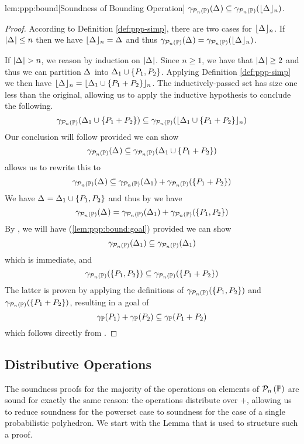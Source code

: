 \begin{replemma}{lem:ppp:bound}[Soundness of Bounding Operation]
$\gamma_{\mathcal{P}_{n}\left( \mathbb{P} \right)}(\Delta_{}) \subseteq \gamma_{\mathcal{P}_{n}\left( \mathbb{P} \right)}(
    \lfloor \Delta_{} \rfloor_{n}) $.
\end{replemma}

\begin{proof}
According to Definition \ref{def:ppp-simp}, there are two cases for 
$\lfloor \Delta_{} \rfloor_{n}$.  If $\left| \Delta_{} \right| \leq n$ then we
have $\lfloor \Delta_{} \rfloor_{n} = \Delta_{}$ and thus
$\gamma_{\mathcal{P}_{n}\left( \mathbb{P} \right)}(\Delta_{}) = \gamma_{\mathcal{P}_{n}\left( \mathbb{P} \right)}(\lfloor \Delta_{} \rfloor_{n})$.

If $\left| \Delta_{} \right| > n$, we reason by induction on $\left| \Delta_{} \right|$.
Since $n \geq 1$, we have that $\left| \Delta_{} \right| \geq 2$ and thus we
 can partition $\Delta_{}$ into $\Delta_{1} \cup \{P_{1},P_{2}\}$.  Applying
Definition \ref{def:ppp-simp} we then have
$\lfloor \Delta_{} \rfloor_{n} = \lfloor \Delta_{1} \cup \{P_{1} + P_{2}\} \rfloor_{n}$.
The inductively-passed set has size one less than the original, allowing us to apply
the inductive hypothesis to conclude the following.
\[\gamma_{\mathcal{P}_{n}\left( \mathbb{P} \right)}(\Delta_{1} \cup \left\{ P_{1} + P_{2} \right\}) \subseteq \gamma_{\mathcal{P}_{n}\left( \mathbb{P} \right)}(
    \lfloor \Delta_{1} \cup \{P_{1} + P_{2}\} \rfloor_{n})\]
Our conclusion will follow provided we can show
\[
\gamma_{\mathcal{P}_{n}\left( \mathbb{P} \right)}(\Delta_{}) \subseteq \gamma_{\mathcal{P}_{n}\left( \mathbb{P} \right)}(\Delta_{1} \cup \{P_{1} + P_{2}\})
\]
 allows us to rewrite this to
\begin{equation}
\label{lem:ppp:bound:goal}
\ppsconc{\pps{}} \subseteq \ppsconc{\pps{1}} + \ppsconc{\{\pp{1} + \pp{2}\}}
\end{equation}
We have $\Delta_{} = \Delta_{1} \cup \{P_{1}, P_{2}\}$ and thus by 
we have
\[\gamma_{\mathcal{P}_{n}\left( \mathbb{P} \right)}(\Delta_{}) = \gamma_{\mathcal{P}_{n}\left( \mathbb{P} \right)}(\Delta_{1}) + \gamma_{\mathcal{P}_{n}\left( \mathbb{P} \right)}(\{P_{1}, P_{2}\})\]
By , we will have (\ref{lem:ppp:bound:goal}) provided we can show
\[\gamma_{\mathcal{P}_{n}\left( \mathbb{P} \right)}(\Delta_{1}) \subseteq \gamma_{\mathcal{P}_{n}\left( \mathbb{P} \right)}(\Delta_{1})\]
which is immediate, and
\[\gamma_{\mathcal{P}_{n}\left( \mathbb{P} \right)}(\{P_{1},P_{2}\}) \subseteq \gamma_{\mathcal{P}_{n}\left( \mathbb{P} \right)}(\left\{ P_{1} + P_{2} \right\})\]
The latter is proven by applying the definitions of
$\gamma_{\mathcal{P}_{n}\left( \mathbb{P} \right)}(\{P_{1},P_{2}\})$ and $\gamma_{\mathcal{P}_{n}\left( \mathbb{P} \right)}(\left\{ P_{1}+P_{2} \right\})$, resulting in a goal of
\[\gamma_{\mathbb{P}}(P_{1}) + \gamma_{\mathbb{P}}(P_{2}) \subseteq \gamma_{\mathbb{P}}(P_{1} + P_{2})\]
which follows directly from .
\end{proof}

\subsection{Distributive Operations}
The soundness proofs for the majority of the operations on elements of $\mathcal{P}_{n}\left( \mathbb{P} \right)$ are sound
for exactly the same reason: the operations distribute over $+$, allowing us to reduce soundness
for the powerset case to soundness for the case of a single probabilistic polyhedron.  We
start with the Lemma that is used to structure such a proof.

